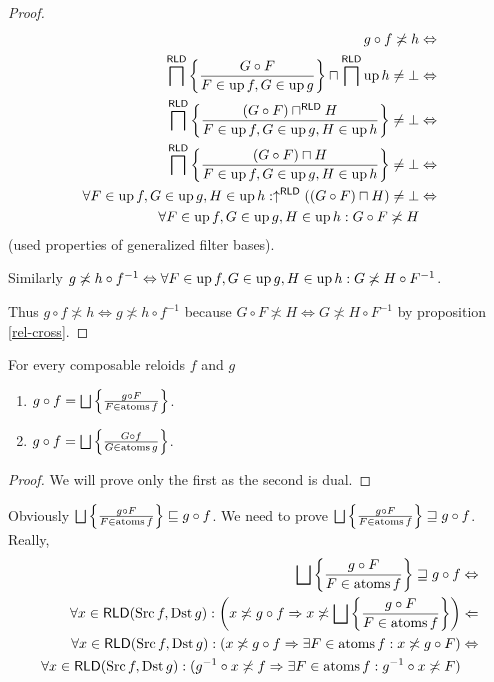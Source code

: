 \begin{proof}
~
\begin{align*}
g\circ f\not\asymp h & \Leftrightarrow\\
\bigsqcap^{\mathsf{RLD}}\left\{ \frac{G\circ F}{F\in\operatorname{up} f,G\in\operatorname{up} g}\right\}\sqcap\bigsqcap^{\mathsf{RLD}}\operatorname{up} h\ne\bot & \Leftrightarrow\\
\bigsqcap^{\mathsf{RLD}}\left\{ \frac{(G\circ F)\sqcap^{\mathsf{RLD}} H}{F\in\operatorname{up} f,G\in\operatorname{up} g,H\in\operatorname{up} h}\right\}\ne\bot & \Leftrightarrow\\
\bigsqcap^{\mathsf{RLD}}\left\{ \frac{(G\circ F)\sqcap H}{F\in\operatorname{up} f,G\in\operatorname{up} g,H\in\operatorname{up} h}\right\}\ne\bot & \Leftrightarrow\\
\forall F\in\operatorname{up} f,G\in\operatorname{up} g,H\in\operatorname{up} h:\uparrow^{\mathsf{RLD}}((G\circ F)\sqcap H)\ne\bot & \Leftrightarrow\\
\forall F\in\operatorname{up} f,G\in\operatorname{up} g,H\in\operatorname{up} h:G\circ F\not\asymp H
\end{align*}
(used properties of generalized filter bases).

Similarly $g\not\asymp h\circ f^{-1}\Leftrightarrow\forall F\in\operatorname{up} f,G\in\operatorname{up} g,H\in\operatorname{up} h:G\not\asymp H\circ F^{-1}$.

Thus $g\circ f\nasymp h\Leftrightarrow g\nasymp h\circ f^{-1}$ because
$G\circ F\nasymp H\Leftrightarrow G\nasymp H\circ F^{-1}$ by proposition
\ref{rel-cross}.\end{proof}
\begin{thm}
For every composable reloids $f$ and $g$
\begin{enumerate}
\item $g\circ f=\bigsqcup\setcond{g\circ F}{F\in\atoms f}$.
\item $g\circ f=\bigsqcup\setcond{G\circ f}{G\in\atoms g}$.
\end{enumerate}
\end{thm}
\begin{proof}
We will prove only the first as the second is dual.
\end{proof}
Obviously $\bigsqcup\setcond{g\circ F}{F\in\atoms f}\sqsubseteq g\circ f$. We need to prove $\bigsqcup\setcond{g\circ F}{F\in\atoms f}\sqsupseteq g\circ f$.
Really,
\begin{align*}
\bigsqcup\setcond{g\circ F}{F\in\atoms f}\sqsupseteq g\circ f & \Leftrightarrow\\
\forall x\in\mathsf{RLD}(\Src f,\Dst g):\left(x\nasymp g\circ f\Rightarrow x\nasymp\bigsqcup\setcond{g\circ F}{F\in\atoms f}\right) & \Leftarrow\\
\forall x\in\mathsf{RLD}(\Src f,\Dst g):\left(x\nasymp g\circ f\Rightarrow \exists F\in\atoms f:x\nasymp g\circ F\right) & \Leftrightarrow\\
\forall x\in\mathsf{RLD}(\Src f,\Dst g):(g^{-1}\circ x\nasymp f\Rightarrow \exists F\in\atoms f:g^{-1}\circ x\nasymp F)
\end{align*}
